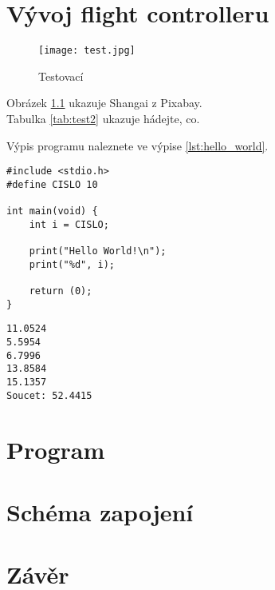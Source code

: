 \documentclass[12pt]{report}
\begin{document}
\chapter[Vývoj flight controlleru]{Vývoj flight controlleru}
\begin{figure}
  \texttt{[image: test.jpg]}
  \caption{Testovací}
  \label{fig:test}
\end{figure}
Obrázek \ref{fig:test} ukazuje Shangai z Pixabay.\\
Tabulka \ref{tab:test2} ukazuje hádejte, co.
	
\lipsum[3]


Výpis programu   naleznete ve výpise \ref{lst:hello_world}.

\begin{lstlisting}[title={Program hello.c}, caption={hello.c}, label={lst:hello_world}]
#include <stdio.h>
#define CISLO 10

int main(void) {
	int i = CISLO;

	print("Hello World!\n");
	print("%d", i);

	return (0);
}
\end{lstlisting}

\lipsum[1]	

\begin{lstlisting}[numbers=none, title={Příklad výstupního souboru}]
11.0524
5.5954
6.7996
13.8584
15.1357
Soucet: 52.4415
\end{lstlisting}

\chapter{Program}

\lipsum[1]

\chapter{Schéma zapojení}

\lipsum[1]

\chapter*{Závěr}
	
\lipsum[1]
	
\nocite{*}
\printbibliography					%
\printglossary[title={Zkratky}]		%
\listoffigures						%
\listoftables						%
\end{document}
